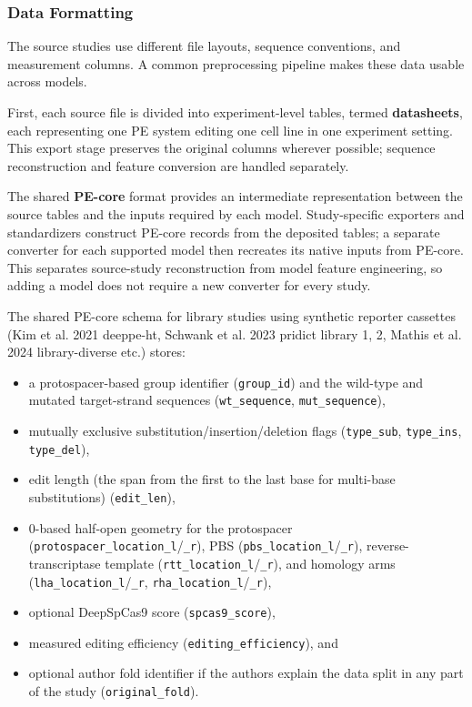 \documentclass{article}
\begin{document}
\subsubsection{Data Formatting}

The source studies use different file layouts, sequence conventions, and measurement columns. A common preprocessing pipeline makes these data usable across models.

First, each source file is divided into experiment-level tables, termed \textbf{datasheets}, each representing one PE system editing one cell line in one experiment setting. This export stage preserves the original columns wherever possible; sequence reconstruction and feature conversion are handled separately.

The shared \textbf{PE-core} format provides an intermediate representation between the source tables and the inputs required by each model. Study-specific exporters and standardizers construct PE-core records from the deposited tables; a separate converter for each supported model then recreates its native inputs from PE-core. This separates source-study reconstruction from model feature engineering, so adding a model does not require a new converter for every study.

The shared PE-core schema for library studies using synthetic reporter cassettes (Kim et al. 2021 deeppe-ht, Schwank et al. 2023 pridict library 1, 2, Mathis et al. 2024 library-diverse etc.) stores:
\begin{itemize}
    \item a protospacer-based group identifier (\nolinkurl{group\_id}) and the wild-type and mutated target-strand sequences (\nolinkurl{wt\_sequence}, \nolinkurl{mut\_sequence}),
    \item mutually exclusive substitution/insertion/deletion flags (\nolinkurl{type\_sub}, \nolinkurl{type\_ins}, \nolinkurl{type\_del}),
    \item edit length (the span from the first to the last base for multi-base substitutions) (\nolinkurl{edit\_len}),
    \item 0-based half-open geometry for the protospacer (\nolinkurl{protospacer\_location\_l}/\nolinkurl{\_r}), PBS (\nolinkurl{pbs\_location\_l}/\nolinkurl{\_r}), reverse-transcriptase template (\nolinkurl{rtt\_location\_l}/\nolinkurl{\_r}), and homology arms (\nolinkurl{lha\_location\_l}/\nolinkurl{\_r}, \nolinkurl{rha\_location\_l}/\nolinkurl{\_r}),
    \item optional DeepSpCas9 score (\nolinkurl{spcas9\_score}),
    \item measured editing efficiency (\nolinkurl{editing\_efficiency}), and
    \item optional author fold identifier if the authors explain the data split in any part of the study (\nolinkurl{original\_fold}).
\end{itemize}
\end{document}
